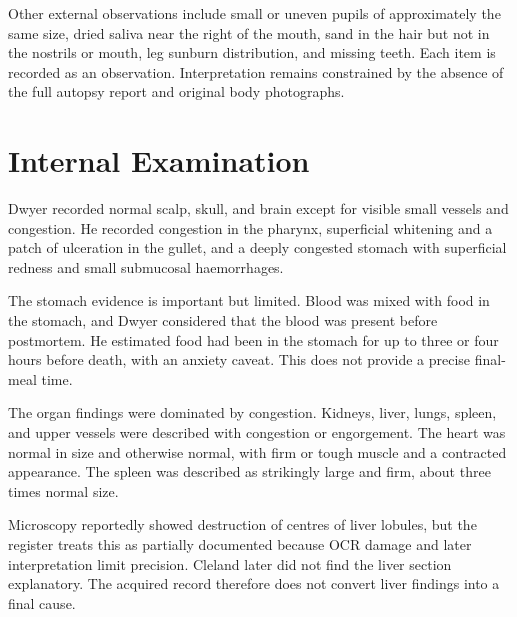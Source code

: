 Other external observations include small or uneven pupils of approximately the same size, dried saliva near the right of the mouth, sand in the hair but not in the nostrils or mouth, leg sunburn distribution, and missing teeth. Each item is recorded as an observation. Interpretation remains constrained by the absence of the full autopsy report and original body photographs.

\section{Internal Examination}

Dwyer recorded normal scalp, skull, and brain except for visible small vessels and congestion. He recorded congestion in the pharynx, superficial whitening and a patch of ulceration in the gullet, and a deeply congested stomach with superficial redness and small submucosal haemorrhages.

The stomach evidence is important but limited. Blood was mixed with food in the stomach, and Dwyer considered that the blood was present before postmortem. He estimated food had been in the stomach for up to three or four hours before death, with an anxiety caveat. This does not provide a precise final-meal time.

The organ findings were dominated by congestion. Kidneys, liver, lungs, spleen, and upper vessels were described with congestion or engorgement. The heart was normal in size and otherwise normal, with firm or tough muscle and a contracted appearance. The spleen was described as strikingly large and firm, about three times normal size.

Microscopy reportedly showed destruction of centres of liver lobules, but the register treats this as partially documented because OCR damage and later interpretation limit precision. Cleland later did not find the liver section explanatory. The acquired record therefore does not convert liver findings into a final cause.

